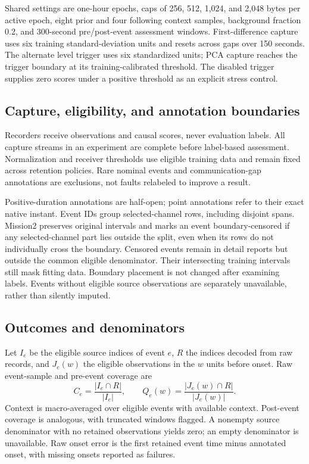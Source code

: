 Shared settings are one-hour epochs, caps of 256, 512, 1,024, and 2,048 bytes per
active epoch, eight prior and four following context samples, background fraction
0.2, and 300-second pre/post-event assessment windows. First-difference capture
uses six training standard-deviation units and resets across gaps over 150 seconds.
The alternate level trigger uses six standardized units; PCA capture reaches the
trigger boundary at its training-calibrated threshold. The disabled trigger supplies
zero scores under a positive threshold as an explicit stress control.



\subsection{Capture, eligibility, and annotation boundaries}
Recorders receive observations and causal scores, never evaluation labels. All
capture streams in an experiment are complete before label-based assessment.
Normalization and receiver thresholds use eligible training data and remain fixed
across retention policies. Rare nominal events and communication-gap annotations
are exclusions, not faults relabeled to improve a result.

Positive-duration annotations are half-open; point annotations refer to their exact
native instant. Event IDs group selected-channel rows, including disjoint spans.
Mission2 preserves original intervals and marks an event boundary-censored if any
selected-channel part lies outside the split, even when its rows do not individually
cross the boundary. Censored events remain in detail reports but outside the common
eligible denominator. Their intersecting training intervals still mask fitting data.
Boundary placement is not changed after examining labels. Events without eligible
source observations are separately unavailable, rather than silently imputed.

\subsection{Outcomes and denominators}
Let $I_e$ be the eligible source indices of event $e$, $R$ the indices decoded from
raw records, and $J_e(w)$ the eligible observations in the $w$ units before onset.
Raw event-sample and pre-event coverage are
\begin{equation}
 C_e=\frac{|I_e\cap R|}{|I_e|},\qquad
 Q_e(w)=\frac{|J_e(w)\cap R|}{|J_e(w)|}.
\end{equation}
Context is macro-averaged over eligible events with available context. Post-event
coverage is analogous, with truncated windows flagged. A nonempty source denominator
with no retained observations yields zero; an empty denominator is unavailable.
Raw onset error is the first retained event time minus annotated onset, with missing
onsets reported as failures.

